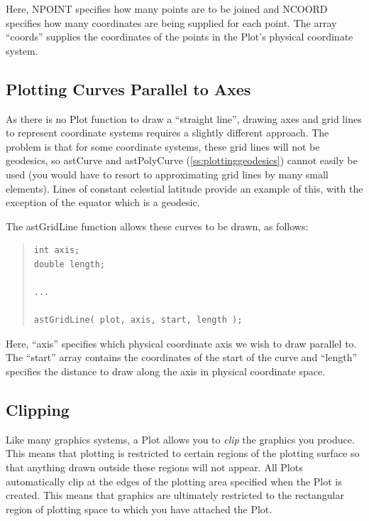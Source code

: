 \documentclass[twoside,11pt]{article}
\newcommand{\htmlref}[2]{#1}
\newcommand{\secref}[1]{\S\ref{#1}}
\renewcommand{\secref}[1]{\ref{#1}}
\begin{document}
Here, NPOINT specifies how many points are to be joined and NCOORD
specifies how many coordinates are being supplied for each point.  The
array ``coords'' supplies the coordinates of the points in the Plot's
physical coordinate system.

\subsection{Plotting Curves Parallel to Axes}

As there is no \htmlref{Plot}{Plot} function to draw a ``straight line'', drawing axes
and grid lines to represent coordinate systems requires a slightly
different approach. The problem is that for some coordinate systems,
these grid lines will not be geodesics, so \htmlref{astCurve}{astCurve} and \htmlref{astPolyCurve}{astPolyCurve}
(\secref{ss:plottinggeodesics}) cannot easily be used (you would have
to resort to approximating grid lines by many small elements). Lines
of constant celestial latitude provide an example of this, with the
exception of the equator which is a geodesic.

The \htmlref{astGridLine}{astGridLine} function allows these curves to be drawn, as follows:

\begin{quote}
\small
\begin{verbatim}
int axis;
double length;

...

astGridLine( plot, axis, start, length );
\end{verbatim}
\normalsize
\end{quote}

Here, ``axis'' specifies which physical coordinate axis we wish to
draw parallel to. The ``start'' array contains the coordinates of the
start of the curve and ``length'' specifies the distance to draw along
the axis in physical coordinate space.

\subsection{\label{ss:clipping}Clipping}

Like many graphics systems, a \htmlref{Plot}{Plot} allows you to {\em{clip}} the graphics
you produce. This means that plotting is restricted to certain regions
of the plotting surface so that anything drawn outside these regions
will not appear.  All Plots automatically clip at the edges of the
plotting area specified when the Plot is created. This means that
graphics are ultimately restricted to the rectangular region of
plotting space to which you have attached the Plot.
\end{document}
